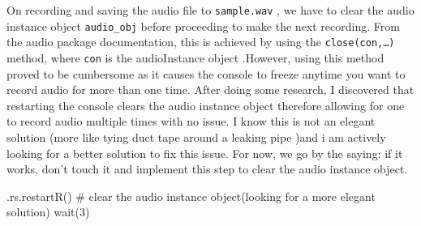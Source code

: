 \documentclass[
  letterpaper,
  DIV=11,
  numbers=noendperiod]{scrreprt}
\newenvironment{Shaded}{\begin{snugshade}}{\end{snugshade}}
\newcommand{\CommentTok}[1]{\textcolor[rgb]{0.37,0.37,0.37}{#1}}
\newcommand{\ConstantTok}[1]{\textcolor[rgb]{0.56,0.35,0.01}{#1}}
\newcommand{\DecValTok}[1]{\textcolor[rgb]{0.68,0.00,0.00}{#1}}
\newcommand{\FunctionTok}[1]{\textcolor[rgb]{0.28,0.35,0.67}{#1}}
\newcommand{\NormalTok}[1]{\textcolor[rgb]{0.00,0.23,0.31}{#1}}
\newcommand{\OtherTok}[1]{\textcolor[rgb]{0.00,0.23,0.31}{#1}}
\newcommand{\SpecialCharTok}[1]{\textcolor[rgb]{0.37,0.37,0.37}{#1}}
\newcommand{\StringTok}[1]{\textcolor[rgb]{0.13,0.47,0.30}{#1}}
\begin{document}
\begin{Shaded}
\end{Shaded}

On recording and saving the audio file to \texttt{sample.wav} , we have
to clear the audio instance object \texttt{audio\_obj} before proceeding
to make the next recording. From the audio package documentation, this
is achieved by using the \texttt{close(con,…)} method, where
\texttt{con} is the audioInstance object .However, using this method
proved to be cumbersome as it causes the console to freeze anytime you
want to record audio for more than one time. After doing some research,
I discovered that restarting the console clears the audio instance
object therefore allowing for one to record audio multiple times with no
issue. I know this is not an elegant solution (more like tying duct tape
around a leaking pipe )and i am actively looking for a better solution
to fix this issue. For now, we go by the saying: if it works, don't
touch it and implement this step to clear the audio instance object.

\begin{Shaded}
\begin{Highlighting}[]
\FunctionTok{.rs.restartR}\NormalTok{() }\CommentTok{\# clear the audio instance object(looking for a more elegant solution)}
\FunctionTok{wait}\NormalTok{(}\DecValTok{3}\NormalTok{)}
\end{Highlighting}
\end{Shaded}
\end{document}
